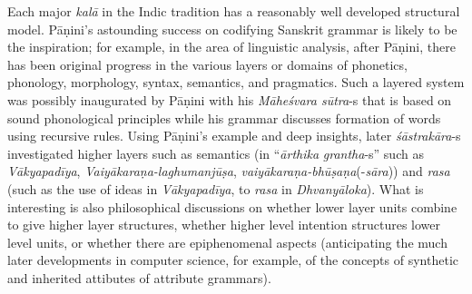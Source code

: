 Each major \textsl{kalā} in the Indic tradition has a reasonably well developed structural model. Pāṇini’s astounding success on codifying Sanskrit grammar is likely to be the inspiration; for example, in the area of linguistic analysis, after Pāṇini, there has been original progress in the various layers or domains of phonetics, phonology, morphology, syntax, semantics, and pragmatics. Such a layered system was possibly inaugurated by Pāṇini with his \textsl{Māheśvara sūtra}-s that is based on sound phonological principles while his grammar discusses formation of words using recursive rules. Using Pāṇini’s example and deep insights, later \textsl{śāstrakāra}-s investigated higher layers such as semantics (in “\textsl{ārthika} \textsl{grantha}-s” such as \textsl{Vākyapadīya}, \textsl{Vaiyākaraṇa-laghumanjūṣa}, \textsl{vaiyākaraṇa-bhūṣaṇa}(-\textsl{sāra})) and \textsl{rasa} (such as the use of ideas in \textsl{Vākyapadīya}, to \textsl{rasa} in \textsl{Dhvanyāloka}). What is interesting is also philosophical discussions on whether lower layer units combine to give higher layer structures, whether higher level intention structures lower level units, or whether there are epiphenomenal aspects (anticipating the much later developments in computer science, for example, of the concepts of synthetic and inherited attibutes of attribute grammars).

